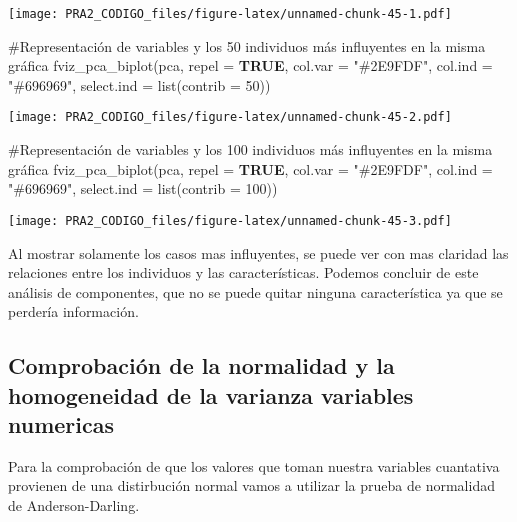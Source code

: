 \documentclass[
]{article}
\newenvironment{Shaded}{\begin{snugshade}}{\end{snugshade}}
\newcommand{\AttributeTok}[1]{\textcolor[rgb]{0.80,0.80,0.80}{#1}}
\newcommand{\CommentTok}[1]{\textcolor[rgb]{0.50,0.62,0.50}{#1}}
\newcommand{\ConstantTok}[1]{\textcolor[rgb]{0.86,0.64,0.64}{\textbf{#1}}}
\newcommand{\DecValTok}[1]{\textcolor[rgb]{0.86,0.86,0.80}{#1}}
\newcommand{\FunctionTok}[1]{\textcolor[rgb]{0.94,0.94,0.56}{#1}}
\newcommand{\NormalTok}[1]{\textcolor[rgb]{0.80,0.80,0.80}{#1}}
\newcommand{\StringTok}[1]{\textcolor[rgb]{0.80,0.58,0.58}{#1}}
\begin{document}
\texttt{[image: PRA2\_CODIGO\_files/figure-latex/unnamed-chunk-45-1.pdf]}

\begin{Shaded}
\begin{Highlighting}[]
\CommentTok{\#Representación de variables y los 50 individuos más influyentes en la misma gráfica}
\FunctionTok{fviz\_pca\_biplot}\NormalTok{(pca, }\AttributeTok{repel =} \ConstantTok{TRUE}\NormalTok{, }\AttributeTok{col.var =} \StringTok{"\#2E9FDF"}\NormalTok{,}
                \AttributeTok{col.ind =} \StringTok{"\#696969"}\NormalTok{, }\AttributeTok{select.ind =} \FunctionTok{list}\NormalTok{(}\AttributeTok{contrib =} \DecValTok{50}\NormalTok{))}
\end{Highlighting}
\end{Shaded}

\texttt{[image: PRA2\_CODIGO\_files/figure-latex/unnamed-chunk-45-2.pdf]}

\begin{Shaded}
\begin{Highlighting}[]
\CommentTok{\#Representación de variables y los 100 individuos más influyentes en la misma gráfica}
\FunctionTok{fviz\_pca\_biplot}\NormalTok{(pca, }\AttributeTok{repel =} \ConstantTok{TRUE}\NormalTok{, }\AttributeTok{col.var =} \StringTok{"\#2E9FDF"}\NormalTok{,}
                \AttributeTok{col.ind =} \StringTok{"\#696969"}\NormalTok{, }\AttributeTok{select.ind =} \FunctionTok{list}\NormalTok{(}\AttributeTok{contrib =} \DecValTok{100}\NormalTok{))}
\end{Highlighting}
\end{Shaded}

\texttt{[image: PRA2\_CODIGO\_files/figure-latex/unnamed-chunk-45-3.pdf]}

Al mostrar solamente los casos mas influyentes, se puede ver con mas
claridad las relaciones entre los individuos y las características.
Podemos concluir de este análisis de componentes, que no se puede quitar
ninguna característica ya que se perdería información.

\hypertarget{comprobaciuxf3n-de-la-normalidad-y-la-homogeneidad-de-la-varianza-variables-numericas}{%
\subsection{Comprobación de la normalidad y la homogeneidad de la
varianza variables
numericas}\label{comprobaciuxf3n-de-la-normalidad-y-la-homogeneidad-de-la-varianza-variables-numericas}}

Para la comprobación de que los valores que toman nuestra variables
cuantativa provienen de una distirbución normal vamos a utilizar la
prueba de normalidad de Anderson-Darling.
\end{document}
